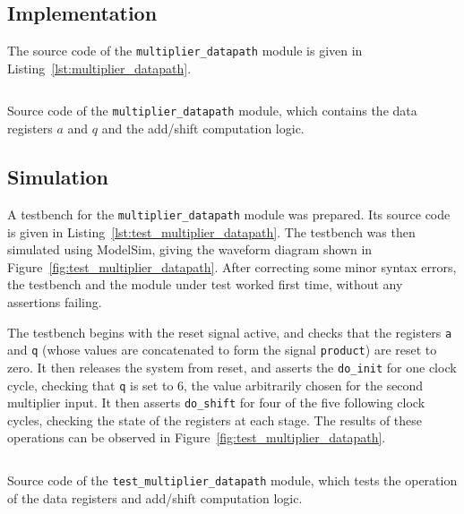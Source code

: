 \documentclass[a4paper]{article}
\begin{document}
\subsection{Implementation}
\label{sec:reg:impl}

The source code of the \texttt{multiplier\_datapath} module is given in Listing~\ref{lst:multiplier_datapath}.

\begin{listing}[ht]
  \inputminted{systemverilog}{../src/multiplier/multiplier_datapath.sv}
  \centering\caption{Source code of the \texttt{multiplier\_datapath} module, which contains the data registers $a$ and $q$ and the add/shift computation logic.}
  \label{lst:multiplier_datapath}
\end{listing}

\subsection{Simulation}
\label{sec:reg:sim}

A testbench for the \texttt{multiplier\_datapath} module was prepared. Its source code is given in Listing~\ref{lst:test_multiplier_datapath}. The testbench was then simulated using ModelSim, giving the waveform diagram shown in Figure~\ref{fig:test_multiplier_datapath}. After correcting some minor syntax errors, the testbench and the module under test worked first time, without any assertions failing.

The testbench begins with the reset signal active, and checks that the registers \texttt{a} and \texttt{q} (whose values are concatenated to form the signal \texttt{product}) are reset to zero. It then releases the system from reset, and asserts the \texttt{do\_init} for one clock cycle, checking that \texttt{q} is set to 6, the value arbitrarily chosen for the second multiplier input. It then asserts \texttt{do\_shift} for four of the five following clock cycles, checking the state of the registers at each stage. The results of these operations can be observed in Figure~\ref{fig:test_multiplier_datapath}.

\begin{listing}[ht]
  \inputminted{systemverilog}{../src/multiplier/test/test_multiplier_datapath.sv}
  \centering\caption{Source code of the \texttt{test\_multiplier\_datapath} module, which tests the operation of the data registers and add/shift computation logic.}
  \label{lst:test_multiplier_datapath}
\end{listing}
\end{document}
